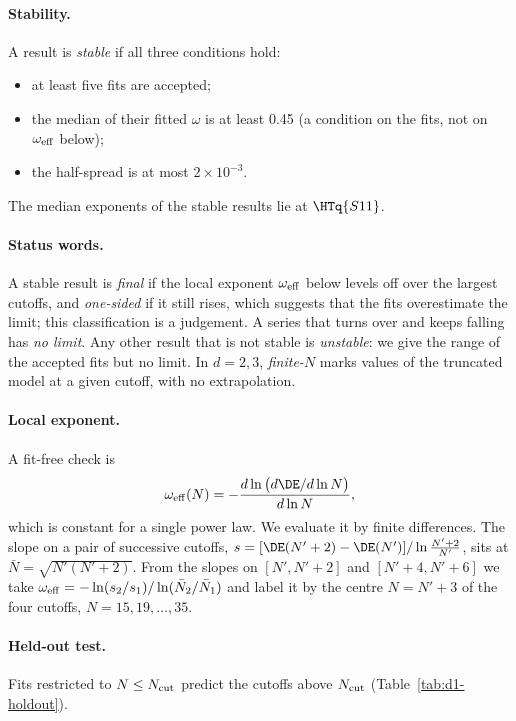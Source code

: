\paragraph{Stability.} A result is \emph{stable} if all three conditions hold:
\begin{itemize}
\item at least five fits are accepted;
\item the median of their fitted $\omega$ is at least 0.45 (a condition on the fits, not on $\omega_{\rm eff}$
 below);
\item the half-spread is at most $2\times10^{-3}$.
\end{itemize}
The median exponents of the stable results lie at $\HTq{S11}$.

\paragraph{Status words.} A stable result is \emph{final} if the local exponent $\omega_{\rm eff}$ below levels off
over the largest cutoffs, and \emph{one-sided} if it still rises, which suggests that the fits overestimate the limit;
this classification is a judgement. A series that turns over and keeps falling has \emph{no limit}. Any other result
that is not stable is \emph{unstable}: we give the range of the accepted fits but no limit. In $d=2,3$,
\emph{finite-$N$} marks values of the truncated model at a given cutoff, with no extrapolation.

\paragraph{Local exponent.} A fit-free check is
\begin{equation}
 \omega_{\rm eff}(N)=-\frac{d\ln\big(d\DE/d\ln N\big)}{d\ln N},
 \label{eq:omegaeff}
\end{equation}
which is constant for a single power law. We evaluate it by finite differences. The slope on a pair of successive
cutoffs, $s=[\DE(N'+2)-\DE(N')]/\ln\frac{N'+2}{N'}$, sits at $\bar N=\sqrt{N'(N'+2)}$. From the slopes on
$[N',N'+2]$ and $[N'+4,N'+6]$ we take $\omega_{\rm eff}=-\ln(s_2/s_1)/\ln(\bar N_2/\bar N_1)$ and label it by
the centre $N=N'+3$ of the four cutoffs, $N=15,19,\dots,35$.

\paragraph{Held-out test.} Fits restricted to $N\le N_{\rm cut}$ predict the cutoffs above $N_{\rm cut}$
(Table~\ref{tab:d1-holdout}).

